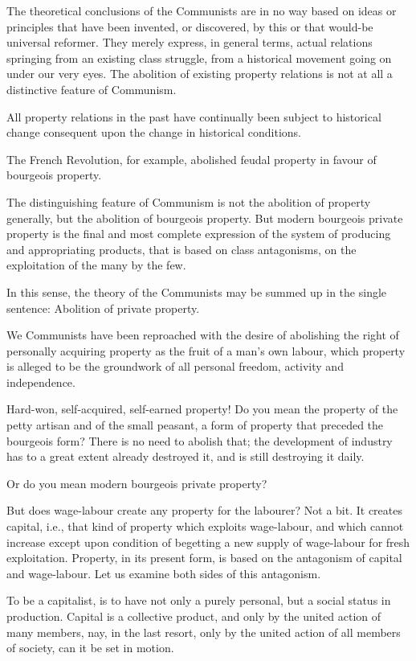 \documentclass[11pt]{book}
\begin{document}
The theoretical conclusions of the Communists are in no way
based on ideas or principles that have been invented, or
discovered, by this or that would-be universal reformer.  They
merely express, in general terms, actual relations springing from
an existing class struggle, from a historical movement going on
under our very eyes.  The abolition of existing property
relations is not at all a distinctive feature of Communism.

All property relations in the past have continually been subject
to historical change consequent upon the change in historical
conditions.

The French Revolution, for example, abolished feudal property in
favour of bourgeois property.

The distinguishing feature of Communism is not the abolition of
property generally, but the abolition of bourgeois property. But
modern bourgeois private property is the final and most complete
expression of the system of producing and appropriating products,
that is based on class antagonisms, on the exploitation of the
many by the few.

In this sense, the theory of the Communists may be summed up in
the single sentence: Abolition of private property.

We Communists have been reproached with the desire of abolishing
the right of personally acquiring property as the fruit of a
man's own labour, which property is alleged to be the groundwork
of all personal freedom, activity and independence.

Hard-won, self-acquired, self-earned property!  Do you mean the
property of the petty artisan and of the small peasant, a form of
property that preceded the bourgeois form?  There is no need to
abolish that; the development of industry has to a great extent
already destroyed it, and is still destroying it daily.

Or do you mean modern bourgeois private property?

But does wage-labour create any property for the labourer?  Not
a bit.  It creates capital, i.e., that kind of property which
exploits wage-labour, and which cannot increase except upon
condition of begetting a new supply of wage-labour for fresh
exploitation.  Property, in its present form, is based on the
antagonism of capital and wage-labour.  Let us examine both sides
of this antagonism.

To be a capitalist, is to have not only a purely personal, but a
social status in production.  Capital is a collective product,
and only by the united action of many members, nay, in the last
resort, only by the united action of all members of society,
can it be set in motion.
\end{document}
